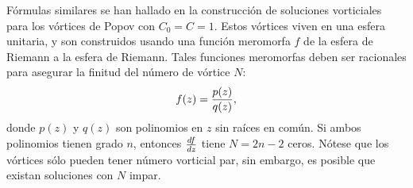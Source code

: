  Fórmulas similares se han hallado en la construcción de soluciones vorticiales para los vórtices de Popov con $C_0=C=1$. Estos vórtices viven en una esfera unitaria, y son construidos usando una función meromorfa $f$ de la esfera de Riemann a la esfera de Riemann. Tales funciones meromorfas deben ser racionales para asegurar la finitud del número de vórtice $N$:
 \begin{align}
	 f(z) = \frac{p(z)}{q(z)}, \label{eq:2.5.1.8}
 \end{align}
 donde $p(z)$ y $q(z)$ son polinomios en $z$ sin raíces en común. Si ambos polinomios tienen grado $n$, entonces $\frac{df}{dz}$ tiene $N=2n-2$ ceros. Nótese que los vórtices sólo pueden tener número vorticial par, sin embargo, es posible que existan soluciones con $N$ impar.